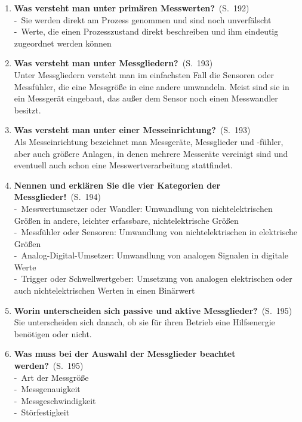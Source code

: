 \documentclass[a4paper,12pt]{article}
\newcommand{\question}[3]{\pagebreak[3]\item {\textbf{#1?}}\ (S.\ #2)#3}
\newcommand{\statement}[3]{\pagebreak[3]\item {\textbf{#1!}}\ (S.\ #2)#3}
\newcommand{\catchword}[1]{\\-\ #1}
\newcommand{\normaltext}[1]{\\#1}
\newcommand{\page}[1]{#1}
\begin{document}
\begin{enumerate}
  \question{Was versteht man unter primären Messwerten}{\page{192}}
  {
    \catchword{Sie werden direkt am Prozess genommen und sind noch unverfälscht}
    \catchword{Werte, die einen Prozesszustand direkt beschreiben und ihm eindeutig zugeordnet
               werden können}
  }

  \question{Was versteht man unter Messgliedern}{\page{193}}
  {
    \normaltext{Unter Messgliedern versteht man im einfachsten Fall die Sensoren oder Messfühler,
                die eine Messgröße in eine andere umwandeln. Meist sind sie in ein Messgerät
                eingebaut, das außer dem Sensor noch einen Messwandler besitzt.}
  }

  \question{Was versteht man unter einer Messeinrichtung}{\page{193}}
  {
    \normaltext{Als Messeinrichtung bezeichnet man Messgeräte, Messglieder und -fühler,
                aber auch größere Anlagen, in denen mehrere Messeräte vereinigt sind
                und eventuell auch schon eine Messwertverarbeitung stattfindet.}
  }

  \statement{Nennen und erklären Sie die vier Kategorien der Messglieder}{\page{194}} 
  {
    \catchword{Messwertumsetzer oder Wandler: Umwandlung von nichtelektrischen Größen in andere,
               leichter erfassbare, nichtelektrische Größen}
    \catchword{Messfühler oder Sensoren: Umwandlung von nichtelektrischen in elektrische Größen}
    \catchword{Analog-Digital-Umsetzer: Umwandlung von analogen Signalen in digitale Werte}
    \catchword{Trigger oder Schwellwertgeber: Umsetzung von analogen elektrischen oder auch
               nichtelektrischen Werten in einen Binärwert}
  }

  \question{Worin unterscheiden sich passive und aktive Messglieder}{\page{195}}
  {
    \normaltext{Sie unterscheiden sich danach, ob sie für ihren Betrieb eine Hilfsenergie
                benötigen oder nicht.}
  }

  \question{Was muss bei der Auswahl der Messglieder beachtet werden}{\page{195}}
  {
    \catchword{Art der Messgröße}
    \catchword{Messgenauigkeit}
    \catchword{Messgeschwindigkeit}
    \catchword{Störfestigkeit}
  }


\end{enumerate}
\end{document}
